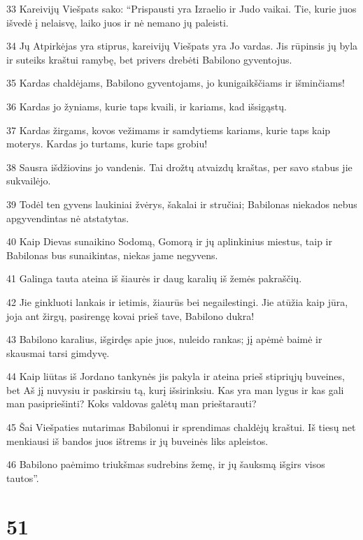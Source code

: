 \par 33 Kareivijų Viešpats sako: “Prispausti yra Izraelio ir Judo vaikai. Tie, kurie juos išvedė į nelaisvę, laiko juos ir nė nemano jų paleisti. 
\par 34 Jų Atpirkėjas yra stiprus, kareivijų Viešpats yra Jo vardas. Jis rūpinsis jų byla ir suteiks kraštui ramybę, bet privers drebėti Babilono gyventojus. 
\par 35 Kardas chaldėjams, Babilono gyventojams, jo kunigaikščiams ir išminčiams! 
\par 36 Kardas jo žyniams, kurie taps kvaili, ir kariams, kad išsigąstų. 
\par 37 Kardas žirgams, kovos vežimams ir samdytiems kariams, kurie taps kaip moterys. Kardas jo turtams, kurie taps grobiu! 
\par 38 Sausra išdžiovins jo vandenis. Tai drožtų atvaizdų kraštas, per savo stabus jie sukvailėjo. 
\par 39 Todėl ten gyvens laukiniai žvėrys, šakalai ir stručiai; Babilonas niekados nebus apgyvendintas nė atstatytas. 
\par 40 Kaip Dievas sunaikino Sodomą, Gomorą ir jų aplinkinius miestus, taip ir Babilonas bus sunaikintas, niekas jame negyvens. 
\par 41 Galinga tauta ateina iš šiaurės ir daug karalių iš žemės pakraščių. 
\par 42 Jie ginkluoti lankais ir ietimis, žiaurūs bei negailestingi. Jie atūžia kaip jūra, joja ant žirgų, pasirengę kovai prieš tave, Babilono dukra! 
\par 43 Babilono karalius, išgirdęs apie juos, nuleido rankas; jį apėmė baimė ir skausmai tarsi gimdyvę. 
\par 44 Kaip liūtas iš Jordano tankynės jis pakyla ir ateina prieš stipriųjų buveines, bet Aš jį nuvysiu ir paskirsiu tą, kurį išsirinksiu. Kas yra man lygus ir kas gali man pasipriešinti? Koks valdovas galėtų man prieštarauti? 
\par 45 Šai Viešpaties nutarimas Babilonui ir sprendimas chaldėjų kraštui. Iš tiesų net menkiausi iš bandos juos ištrems ir jų buveinės liks apleistos. 
\par 46 Babilono paėmimo triukšmas sudrebins žemę, ir jų šauksmą išgirs visos tautos”.



\chapter{51}


